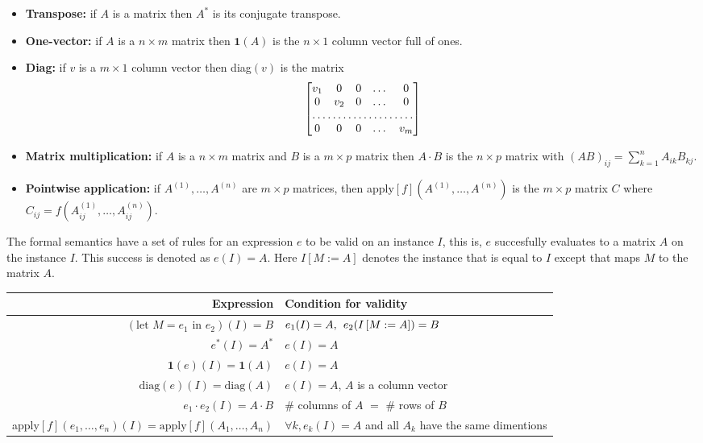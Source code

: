 \begin{itemize}
	\item \textbf{Transpose:} if $A$ is a matrix then $A^*$ is its conjugate transpose.
	\item \textbf{One-vector:} if $A$ is a $n\times m$ matrix then $\mathbf{1}(A)$ is the $n\times 1$ column vector full of ones.
	\item \textbf{Diag:} if $v$ is a $m\times 1$ column vector then diag$(v)$ is the matrix
		\[
			\begin{bmatrix}
			    v_{1}       & 0 & 0 & \dots & 0 \\
			    0       & v_{2} & 0 & \dots & 0 \\
			    \hdotsfor{5} \\
			    0       & 0 & 0 & \dots & v_{m}
			\end{bmatrix}
		\]
	\item \textbf{Matrix multiplication:} if $A$ is a $n\times m$ matrix and $B$ is a $m\times p$ matrix then $A\cdot B$ is the $n\times p$ matrix with $(AB)_{ij}=\sum_{k=1}^n A_{ik}B_{kj}$.
	\item \textbf{Pointwise application:} if $A^{(1)}, \ldots, A^{(n)}$ are $m\times p$ matrices, then apply$\left[ f \right](A^{(1)}, \ldots, A^{(n)})$ is the $m\times p$ matrix $C$ where $C_{ij}=f(A^{(1)}_{ij}, \ldots, A^{(n)}_{ij})$.
\end{itemize}
	
	The formal semantics have a set of rules for an expression $e$ to be valid on an instance $I$, this is, $e$ succesfully evaluates to a matrix $A$ on the instance $I$. This success is denoted as $e(I)=A$. Here $I\left[ M:=A\right]$ denotes the instance that is equal to $I$ except that maps $M$ to the matrix $A$.
	
	\begin{center}
    \begin{tabular}{ r | l }
    \hline
    \textbf{Expression} & \textbf{Condition for validity}\\ \hline
    $(\text{let } M=e_1 \text{ in } e_2)(I)=B$ & $e_1(I)=A,\hspace{1ex}e_2(I\left[ M:=A\right])=B$ \\ 
    $e^*(I)=A^*$ & $e(I)=A$ \\
    $\mathbf{1}(e)(I)=\mathbf{1}(A)$ & $e(I)=A$ \\
    $\text{diag}(e)(I)=\text{diag}(A)$ & $e(I)=A$, $A$ is a column vector \\
    $e_1\cdot e_2(I)=A\cdot B$ & \# columns of $A$ $=$ \# rows of $B$ \\
    apply$\left[ f\right](e_1, \ldots, e_n)(I)=\text{apply}\left[ f\right](A_1, \ldots, A_n)$ & $\forall k, e_k(I)=A$ and all $A_k$ have the same dimentions \\
    \end{tabular}
\end{center}

